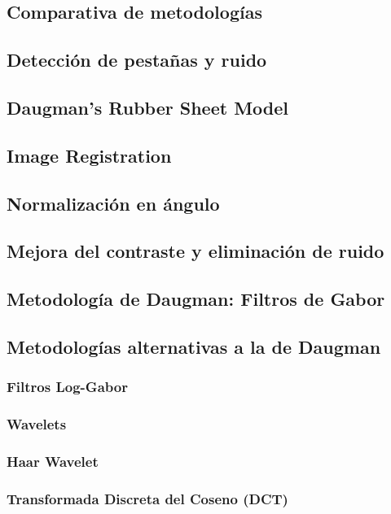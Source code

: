 \subsection{Comparativa de metodologías}
\subsection{Detección de pestañas y ruido}


\label{sec:normalizacion}
\subsection{Daugman's Rubber Sheet Model}
\subsection{Image Registration}
\subsection{Normalización en ángulo}
\subsection{Mejora del contraste y eliminación de ruido}


\label{sec:codificacion}
\subsection{Metodología de Daugman: Filtros de Gabor}
\subsection{Metodologías alternativas a la de Daugman}
\subsubsection{Filtros Log-Gabor} \label{subsubsec:filtrosLogGabor}
\subsubsection{Wavelets}
\subsubsection{Haar Wavelet}
\subsubsection{Transformada Discreta del Coseno (DCT)}
